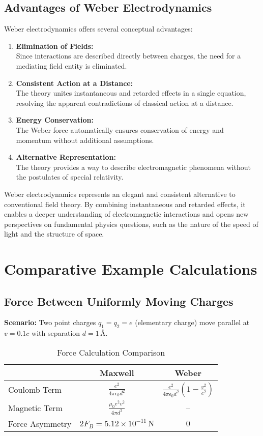 \subsection{Advantages of Weber Electrodynamics}
Weber electrodynamics offers several conceptual advantages:
\begin{enumerate}
    \item \textbf{Elimination of Fields:}\\Since interactions are described directly between charges, the need for a mediating field entity is eliminated.
    \item \textbf{Consistent Action at a Distance:}\\The theory unites instantaneous and retarded effects in a single equation, resolving the apparent contradictions of classical action at a distance.
    \item \textbf{Energy Conservation:}\\The Weber force automatically ensures conservation of energy and momentum without additional assumptions.
    \item \textbf{Alternative Representation:}\\The theory provides a way to describe electromagnetic phenomena without the postulates of special relativity.
\end{enumerate}

Weber electrodynamics represents an elegant and consistent alternative to conventional field theory. By combining instantaneous and retarded effects, it enables
a deeper understanding of electromagnetic interactions and opens new perspectives on fundamental physics questions, such as the nature of the speed of light and the structure
of space.

\section{Comparative Example Calculations}
\subsection{Force Between Uniformly Moving Charges}

\textbf{Scenario:} Two point charges $q_1 = q_2 = e$ (elementary charge) move parallel at $v = 0.1c$ with separation $d = 1\,\text{\AA}$.

\begin{table}[ht]
\centering
\caption{Force Calculation Comparison}
\begin{tabular}{lcc}
\toprule
 & \textbf{Maxwell} & \textbf{Weber} \\
\midrule
Coulomb Term & $\displaystyle\frac{e^2}{4\pi\epsilon_0 d^2}$ & $\displaystyle\frac{e^2}{4\pi\epsilon_0 d^2}\left(1-\frac{v^2}{c^2}\right)$ \\
Magnetic Term & $\displaystyle\frac{\mu_0 e^2 v^2}{4\pi d^2}$ & -- \\
\hline
Force Asymmetry & $2F_B = 5.12\times10^{-11}\,\text{N}$ & $0$ \\
\bottomrule
\end{tabular}
\end{table}

